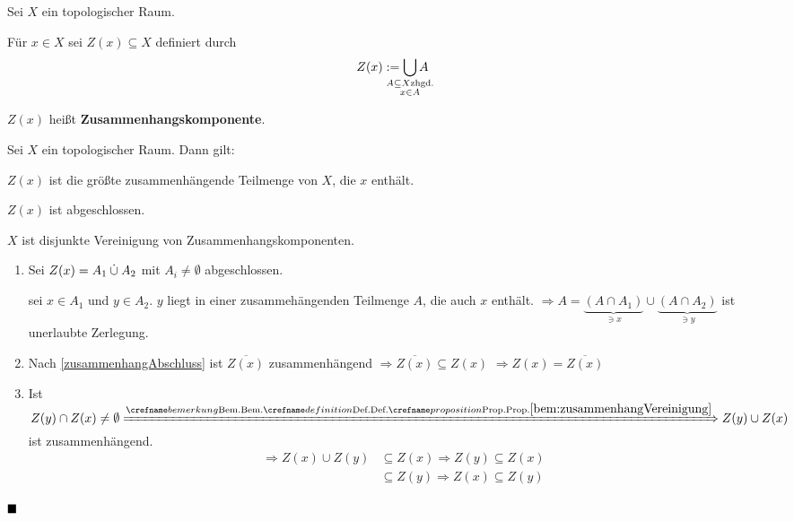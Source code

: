 \begin{definition}%
    Sei $X$ ein topologischer Raum.
    
    Für $x \in X$ sei $Z(x) \subseteq X$ definiert durch
    \[Z(x) := \bigcup_{\mathclap{\substack{A \subseteq X \text{zhgd.}\\ x \in A}}} A\]

     $Z(x)$ heißt \textbf{Zusammenhangskomponente}.
\end{definition}

\begin{bemerkung}
    Sei $X$ ein topologischer Raum. Dann gilt:
    \begin{bemenum}
        \item $Z(x)$ ist die größte zusammenhängende Teilmenge von $X$,
              die $x$ enthält.
        \item $Z(x)$ ist abgeschlossen.
        \item $X$ ist disjunkte Vereinigung von Zusammenhangskomponenten.
    \end{bemenum}
\end{bemerkung}

\begin{beweis}\leavevmode
    \begin{enumerate}[label=\alph*)]
        \item Sei $Z(x) = A_1 \mathbin{\dot{\cup}} A_2$ mit $A_i \neq \emptyset$ abgeschlossen.

            \Obda sei $x \in A_1$ und $y \in A_2$. $y$ liegt in einer zusammehängenden
            Teilmenge $A$, die auch $x$ enthält.
            $\Rightarrow A = \underbrace{(A \cap A_1)}_{\ni x} \cup \underbrace{(A \cap A_2)}_{\ni y}$
            ist unerlaubte Zerlegung.
        \item Nach \cref{zusammenhangAbschluss} ist $\overline{Z(x)}$
              zusammenhängend $\Rightarrow \overline{Z(x)} \subseteq Z(x)$
              $\Rightarrow Z(x) = \overline{Z(x)}$
        \item Ist $Z(y) \cap Z(x) \neq \emptyset \xRightarrow{\crefabbr{bem:zusammenhangVereinigung}} Z(y) \cup Z(x)$
              ist zusammenhängend. \\
              \begin{align*}
                \Rightarrow Z(x) \cup Z(y) &\subseteq Z(x) \Rightarrow Z(y) \subseteq Z(x)\\
                                           &\subseteq Z(y) \Rightarrow Z(x) \subseteq Z(y)
              \end{align*} 
    \end{enumerate}

    $\qed$
\end{beweis}

